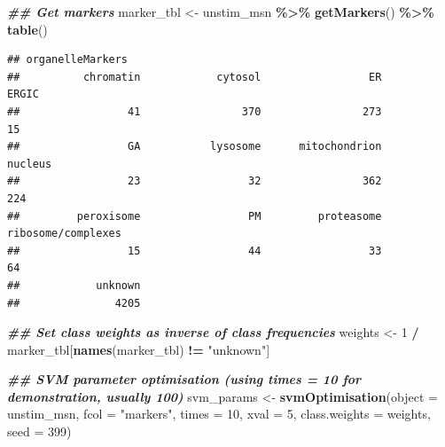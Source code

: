 \documentclass[9pt,a4paper,]{extarticle}
\newenvironment{Shaded}{\begin{snugshade}}{\end{snugshade}}
\newcommand{\AttributeTok}[1]{\textcolor[rgb]{0.13,0.29,0.53}{#1}}
\newcommand{\DecValTok}[1]{\textcolor[rgb]{0.00,0.00,0.81}{#1}}
\newcommand{\DocumentationTok}[1]{\textcolor[rgb]{0.56,0.35,0.01}{\textbf{\textit{#1}}}}
\newcommand{\FunctionTok}[1]{\textcolor[rgb]{0.13,0.29,0.53}{\textbf{#1}}}
\newcommand{\NormalTok}[1]{#1}
\newcommand{\OtherTok}[1]{\textcolor[rgb]{0.56,0.35,0.01}{#1}}
\newcommand{\SpecialCharTok}[1]{\textcolor[rgb]{0.81,0.36,0.00}{\textbf{#1}}}
\newcommand{\StringTok}[1]{\textcolor[rgb]{0.31,0.60,0.02}{#1}}
\begin{document}
\begin{Shaded}
\begin{Highlighting}[]
\DocumentationTok{\#\# Get markers}
\NormalTok{marker\_tbl }\OtherTok{\textless{}{-}}\NormalTok{ unstim\_msn }\SpecialCharTok{\%\textgreater{}\%}
  \FunctionTok{getMarkers}\NormalTok{() }\SpecialCharTok{\%\textgreater{}\%}
  \FunctionTok{table}\NormalTok{()}
\end{Highlighting}
\end{Shaded}

\begin{verbatim}
## organelleMarkers
##          chromatin            cytosol                 ER              ERGIC 
##                 41                370                273                 15 
##                 GA           lysosome      mitochondrion            nucleus 
##                 23                 32                362                224 
##         peroxisome                 PM         proteasome ribosome/complexes 
##                 15                 44                 33                 64 
##            unknown 
##               4205
\end{verbatim}

\begin{Shaded}
\begin{Highlighting}[]
\DocumentationTok{\#\# Set class weights as inverse of class frequencies}
\NormalTok{weights }\OtherTok{\textless{}{-}} \DecValTok{1} \SpecialCharTok{/}\NormalTok{ marker\_tbl[}\FunctionTok{names}\NormalTok{(marker\_tbl) }\SpecialCharTok{!=} \StringTok{"unknown"}\NormalTok{]}
\end{Highlighting}
\end{Shaded}

\begin{Shaded}
\begin{Highlighting}[]
\DocumentationTok{\#\# SVM parameter optimisation (using times = 10 for demonstration, usually 100)}
\NormalTok{svm\_params }\OtherTok{\textless{}{-}} \FunctionTok{svmOptimisation}\NormalTok{(}\AttributeTok{object =}\NormalTok{ unstim\_msn, }
                              \AttributeTok{fcol =} \StringTok{"markers"}\NormalTok{,}
                              \AttributeTok{times =} \DecValTok{10}\NormalTok{, }
                              \AttributeTok{xval =} \DecValTok{5}\NormalTok{, }
                              \AttributeTok{class.weights =}\NormalTok{ weights,}
                              \AttributeTok{seed =} \DecValTok{399}\NormalTok{)}
\end{Highlighting}
\end{Shaded}
\end{document}
